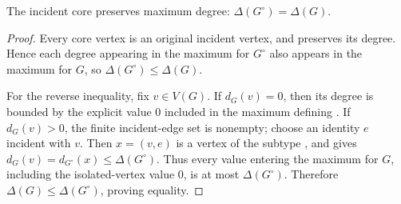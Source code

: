 \begin{lemma}
The incident core preserves maximum degree:
$\Delta(G^{\circ})=\Delta(G)$.
\end{lemma}
\begin{proof}
Every core vertex is an original incident vertex, and
 preserves its degree.  Hence each degree
appearing in the maximum for $G^{\circ}$ also appears in the maximum for
$G$, so $\Delta(G^{\circ})\leq\Delta(G)$.

For the reverse inequality, fix $v\in V(G)$.  If $d_G(v)=0$, then its degree
is bounded by the explicit value $0$ included in the maximum defining
.  If $d_G(v)>0$, the finite incident-edge set is
nonempty; choose an identity $e$ incident with $v$.  Then $x=(v,e)$ is a
vertex of the subtype , and
 gives
$d_G(v)=d_{G^{\circ}}(x)\leq\Delta(G^{\circ})$.  Thus every value entering
the maximum for $G$, including the isolated-vertex value $0$, is at most
$\Delta(G^{\circ})$.  Therefore $\Delta(G)\leq\Delta(G^{\circ})$, proving
equality.
\end{proof}
